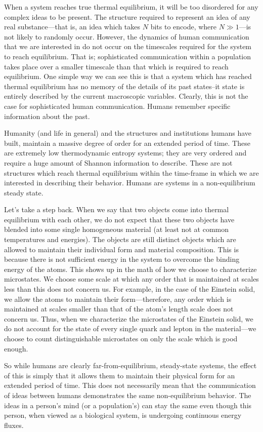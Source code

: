 \documentclass{article}
\begin{document}
When a system reaches true thermal equilibrium, it will be too disordered for any complex ideas to be present. The structure required to represent an idea of any real substance––that is, an idea which takes $N$ bits to encode, where $N\gg 1$––is not likely to randomly occur. However, the dynamics of human communication that we are interested in do not occur on the timescales required for the system to reach equilibrium. That is; sophisticated communication within a population takes place over a smaller timescale than that which is required to reach equilibrium. One simple way we can see this is that a system which has reached thermal equilibrium has no memory of the details of its past states–it state is entirely described by the current macroscopic variables. Clearly, this is not the case for sophisticated human communication. Humans remember specific information about the past. 

Humanity (and life in general) and the structures and institutions humans have built, maintain a massive degree of order for an extended period of time. These are extremely low thermodynamic entropy systems; they are very ordered and require a huge amount of Shannon information to describe. These are not structures which reach thermal equilibrium within the time-frame in which we are interested in describing their behavior. Humans are systems in a non-equilibrium steady state.

Let's take a step back. When we say that two objects come into thermal equilibrium with each other, we do not expect that these two objects have blended into some single homogeneous material (at least not at common temperatures and energies). The objects are still distinct objects which are allowed to maintain their individual form and material composition. This is because there is not sufficient energy in the system to overcome the binding energy of the atoms. This shows up in the math of how we choose to characterize microstates. We choose some scale at which any order that is maintained at scales less than this does not concern us. For example, in the case of the Einstein solid, we allow the atoms to maintain their form––therefore, any order which is maintained at scales smaller than that of the atom's length scale does not concern us. Thus, when we characterize the microstates of the Einstein solid, we do not account for the state of every single quark and lepton in the material––we choose to count distinguishable microstates on only the scale which is good enough.

So while humans are clearly far-from-equilibrium, steady-state systems, the effect of this is simply that it allows them to maintain their physical form for an extended period of time. This does not necessarily mean that the communication of ideas between humans demonstrates the same non-equilibrium behavior. The ideas in a person's mind (or a population's) can stay the same even though this person, when viewed as a biological system, is undergoing continuous energy fluxes.
\end{document}
